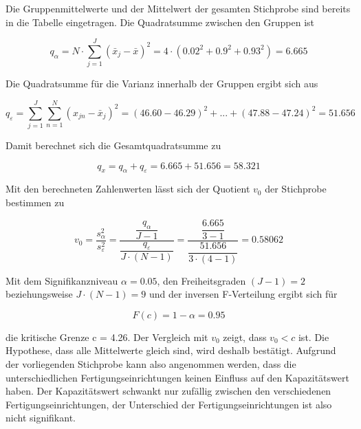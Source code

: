 \noindent Die Gruppenmittelwerte und der Mittelwert der gesamten Stichprobe sind bereits in die Tabelle eingetragen. Die Quadratsumme zwischen den Gruppen ist

\begin{equation}\label{eq:ninenineteen}
q_{\alpha} =N\cdot \sum _{j=1}^{J}(\bar{x}_{j} -\bar{x})^{2}  =4\cdot \left(0.02^{2} +0.9^{2} +0.93^{2} \right)=6.665
\end{equation}

\noindent Die Quadratsumme f\"{u}r die Varianz innerhalb der Gruppen ergibt sich aus

\begin{equation}\label{eq:ninetwenty}
q_{\varepsilon} =\sum _{j=1}^{J}\sum _{n=1}^{N}(x_{jn} -\bar{x}_{j})^{2} =(46.60-46.29)^{2} +...+(47.88-47.24)^{2} =51.656
\end{equation}

\noindent Damit berechnet sich die Gesamtquadratsumme zu

\begin{equation}\label{eq:ninetwentyone}
q_{x} =q_{\alpha} +q_{\varepsilon} =6.665+51.656=58.321
\end{equation}

\noindent Mit den berechneten Zahlenwerten l\"{a}sst sich der Quotient $v_{0}$ der Stichprobe bestimmen zu

\begin{equation}\label{eq:ninetwentytwo}
v_{0} =\dfrac{s_{\alpha}^{2}}{s_{\varepsilon}^{2}} =\dfrac{\dfrac{q_{\alpha}}{J-1}}{\dfrac{q_{\varepsilon}}{J\cdot (N-1)}} =\dfrac{\dfrac{6.665}{3-1}}{\dfrac{51.656}{3\cdot (4-1)}} =0.58062
\end{equation}

\noindent Mit dem Signifikanzniveau $\alpha = 0.05$, den Freiheitsgraden $(J - 1) = 2$ beziehungsweise $J \cdot (N - 1) = 9$ und der inversen F-Verteilung ergibt sich f\"{u}r 

\begin{equation}\label{eq:ninetwentythree}
F(c)=1-\alpha =0.95
\end{equation}

\noindent die kritische Grenze c = 4.26. Der Vergleich mit $v_{0}$ zeigt, dass $v_{0} < c $  ist. Die Hypothese, dass alle Mittelwerte gleich sind, wird deshalb best\"{a}tigt. Aufgrund der vorliegenden Stichprobe kann also angenommen werden, dass die unterschiedlichen Fertigungseinrichtungen keinen Einfluss auf den Kapazit\"{a}tswert haben. Der Kapazit\"{a}tswert schwankt nur zuf\"{a}llig zwischen den verschiedenen Fertigungseinrichtungen, der Unterschied der Fertigungseinrichtungen ist also nicht signifikant.\newline

